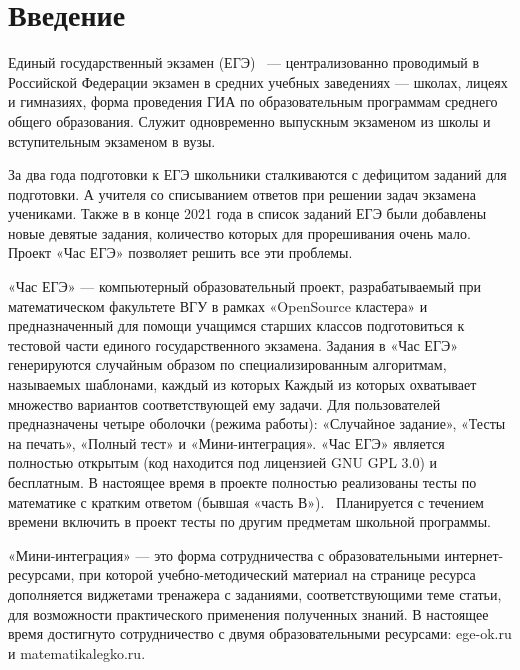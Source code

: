 
\section*{Введение}
Единый государственный экзамен (ЕГЭ)~\cite{ege} --- централизованно проводимый в Российской 
Федерации экзамен в средних учебных заведениях — школах, лицеях и гимназиях,
форма проведения ГИА по образовательным программам среднего общего образования.
Служит одновременно выпускным экзаменом из школы и вступительным экзаменом в вузы.

За два года подготовки к ЕГЭ школьники сталкиваются с дефицитом заданий для подготовки.
А учителя со списыванием ответов при решении задач экзамена учениками. 
Также в в конце 2021 года в список заданий ЕГЭ были добавлены новые девятые задания, 
количество которых для прорешивания очень мало. 
Проект «Час ЕГЭ» позволяет решить все эти проблемы.

«Час ЕГЭ» — компьютерный образовательный проект, разрабатываемый при математическом 
факультете ВГУ в рамках «OpenSource кластера» и предназначенный для помощи учащимся 
старших классов подготовиться к тестовой части единого государственного экзамена.
Задания в «Час ЕГЭ» генерируются случайным образом по специализированным алгоритмам, 
называемых шаблонами, каждый из которых
Каждый из которых охватывает множество вариантов соответствующей ему задачи. Для 
пользователей 
предназначены четыре оболочки (режима работы): «Случайное задание», «Тесты на печать», 
«Полный тест» и «Мини-интеграция».
«Час ЕГЭ» является полностью открытым (код находится под лицензией GNU GPL 3.0) 
и бесплатным.
В настоящее время в проекте полностью реализованы тесты по математике с кратким 
ответом (бывшая «часть В»).~\cite{fipi}
Планируется с течением времени включить в проект тесты по другим предметам школьной 
программы.

«Мини-интеграция» — это форма сотрудничества с образовательными интернет-ресурсами, 
при которой учебно-методический материал на странице ресурса дополняется виджетами 
тренажера с заданиями, соответствующими теме статьи, для возможности практического 
применения полученных знаний.
В настоящее время достигнуто сотрудничество с двумя образовательными ресурсами: ege-ok.ru 
и matematikalegko.ru.
